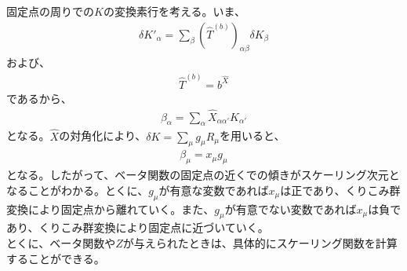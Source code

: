 \documentclass[a4paper,11pt]{jsarticle}
\numberwithin{equation}{section}
\begin{document}
固定点の周りでの$K$の変換素行を考える。いま、
\begin{align}
    \delta K'_\alpha = \sum_{\beta} (\hat{T}^{(b)})_{\alpha \beta} \delta K_{\beta}
\end{align}
および、
\begin{align}
    \hat{T}^{(b)} = b^{\hat{X}}
\end{align}
であるから、
\begin{align}
    \beta_{\alpha} = \sum_{\alpha} \hat{X}_{\alpha \alpha'} K_{\alpha'}
\end{align}
となる。$\hat{X}$の対角化により、$\delta K = \sum_{\mu} g_{\mu} R_{\mu}$を用いると、
\begin{align}
    \beta_{\mu} = x_{\mu} g_{\mu}
\end{align}
となる。したがって、ベータ関数の固定点の近くでの傾きがスケーリング次元となることがわかる。とくに、$g_{\mu}$が有意な変数であれば$x_{\mu}$は正であり、くりこみ群変換により固定点から離れていく。また、$g_{\mu}$が有意でない変数であれば$x_{\mu}$は負であり、くりこみ群変換により固定点に近づいていく。\\
とくに、ベータ関数や$Z$が与えられたときは、具体的にスケーリング関数を計算することができる。
\end{document}
